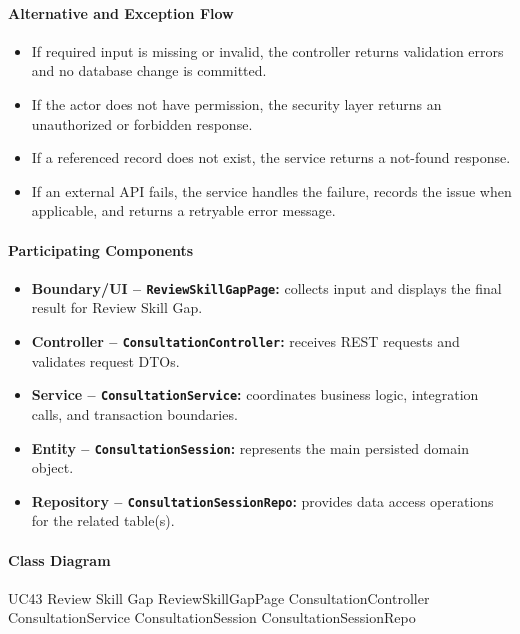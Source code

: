 \paragraph{Alternative and Exception Flow}

\begin{itemize}
    \item If required input is missing or invalid, the controller returns validation errors and no database change is committed.
    \item If the actor does not have permission, the security layer returns an unauthorized or forbidden response.
    \item If a referenced record does not exist, the service returns a not-found response.
    \item If an external API fails, the service handles the failure, records the issue when applicable, and returns a retryable error message.
\end{itemize}

\paragraph{Participating Components}

\begin{itemize}
    \item \textbf{Boundary/UI -- \texttt{ReviewSkillGapPage}:} collects input and displays the final result for Review Skill Gap.
    \item \textbf{Controller -- \texttt{ConsultationController}:} receives REST requests and validates request DTOs.
    \item \textbf{Service -- \texttt{ConsultationService}:} coordinates business logic, integration calls, and transaction boundaries.
    \item \textbf{Entity -- \texttt{ConsultationSession}:} represents the main persisted domain object.
    \item \textbf{Repository -- \texttt{ConsultationSessionRepo}:} provides data access operations for the related table(s).
\end{itemize}

\paragraph{Class Diagram}

\ClassDiagram
{UC43 Review Skill Gap}
{ReviewSkillGapPage}
{ConsultationController}
{ConsultationService}
{ConsultationSession}
{ConsultationSessionRepo}

